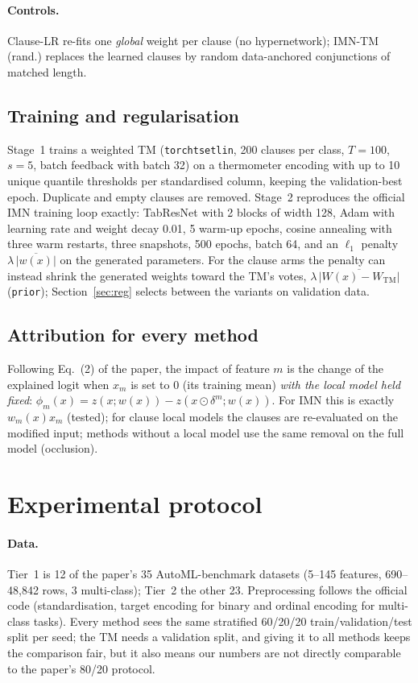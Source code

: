 \documentclass[10pt,a4paper]{article}
\newcommand{\imn}{\textsc{IMN}}
\newcommand{\arm}[1]{\textsf{#1}}
\begin{document}
\paragraph{Controls.} \arm{Clause-LR} re-fits one \emph{global} weight per clause (no hypernetwork);
\arm{IMN-TM (rand.)} replaces the learned clauses by random data-anchored conjunctions of matched length.

\subsection{Training and regularisation}
Stage~1 trains a weighted TM (\texttt{torchtsetlin}, 200 clauses per class, $T=100$, $s=5$, batch
feedback with batch 32) on a thermometer encoding with up to 10 unique quantile thresholds per
standardised column, keeping the validation-best epoch. Duplicate and empty clauses are removed. Stage~2
reproduces the official \imn{} training loop exactly: TabResNet with 2 blocks of width 128, Adam with
learning rate and weight decay 0.01, 5 warm-up epochs, cosine annealing with three warm restarts, three
snapshots, 500 epochs, batch 64, and an $\ell_1$ penalty $\lambda\,\overline{|w(x)|}$ on the generated
parameters. For the clause arms the penalty can instead shrink the generated weights toward the TM's votes,
$\lambda\,\overline{|W(x)-W_\text{TM}|}$ (\texttt{prior}); Section~\ref{sec:reg} selects between the variants on
validation data.

\subsection{Attribution for every method}
Following Eq.~(2) of the paper, the impact of feature $m$ is the change of the explained logit when $x_m$
is set to 0 (its training mean) \emph{with the local model held fixed}:
$\phi_m(x)=z(x;w(x))-z(x\odot\delta^m;w(x))$. For \imn{} this is exactly $w_m(x)x_m$ (tested); for clause
local models the clauses are re-evaluated on the modified input; methods without a local model use the same
removal on the full model (occlusion).



\section{Experimental protocol}\label{sec:protocol}
\paragraph{Data.} Tier~1 is 12 of the paper's 35 AutoML-benchmark datasets (5--145 features, 690--48,842
rows, 3 multi-class); Tier~2 the other 23. Preprocessing follows the official code (standardisation, target
encoding for binary and ordinal encoding for multi-class tasks). Every method sees the same stratified
60/20/20 train/validation/test split per seed; the TM needs a validation split, and giving it to all
methods keeps the comparison fair, but it also means our numbers are not directly comparable to the
paper's 80/20 protocol.
\end{document}
